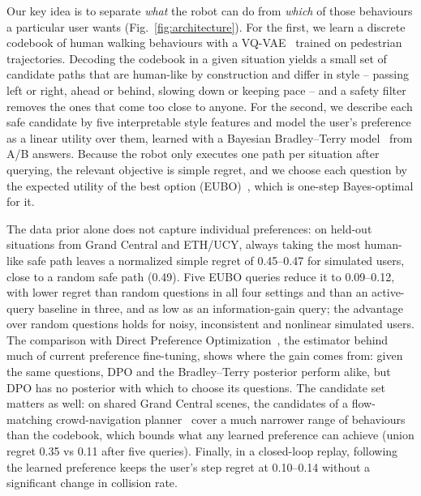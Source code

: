 Our key idea is to separate \emph{what} the robot can do from \emph{which} of those behaviours a particular user wants (Fig.~\ref{fig:architecture}).
For the first, we learn a discrete codebook of human walking behaviours with a VQ-VAE~\citep{vandenoord2017neural} trained on pedestrian
trajectories. Decoding the codebook in a given situation yields a small set of candidate paths that are human-like by construction and
differ in style -- passing left or right, ahead or behind, slowing down or keeping pace -- and a safety filter removes the ones that come too
close to anyone. For the second, we describe each safe candidate by five interpretable style features and model the user's preference as a
linear utility over them, learned with a Bayesian Bradley--Terry model~\citep{bradley1952rank} from A/B answers. Because the robot only
executes one path per situation after querying, the relevant objective is simple regret, and we choose each question by the expected utility
of the best option (EUBO)~\citep{astudillo2023qeubo}, which is one-step Bayes-optimal for it.

The data prior alone does not capture individual preferences: on held-out situations from Grand Central and ETH/UCY, always taking the most
human-like safe path leaves a normalized simple regret of 0.45--0.47 for simulated users, close to a random safe path (0.49). Five EUBO
queries reduce it to 0.09--0.12, with lower regret than random questions in all four settings and than an active-query baseline in three,
and as low as an information-gain query; the advantage over random questions holds for noisy, inconsistent and nonlinear simulated users.
The comparison with Direct Preference Optimization~\citep{rafailov2023direct}, the estimator behind much of current preference fine-tuning,
shows where the gain comes from: given the same questions, DPO and the Bradley--Terry posterior perform alike, but DPO has no posterior with
which to choose its questions. The candidate set matters as well: on shared Grand Central scenes, the candidates of a flow-matching
crowd-navigation planner~\citep{singha2026crowdfm} cover a much narrower range of behaviours than the codebook, which bounds what any learned preference
can achieve (union regret 0.35 vs 0.11 after five queries). Finally, in a closed-loop replay, following the learned preference keeps the
user's step regret at 0.10--0.14 without a significant change in collision rate.

